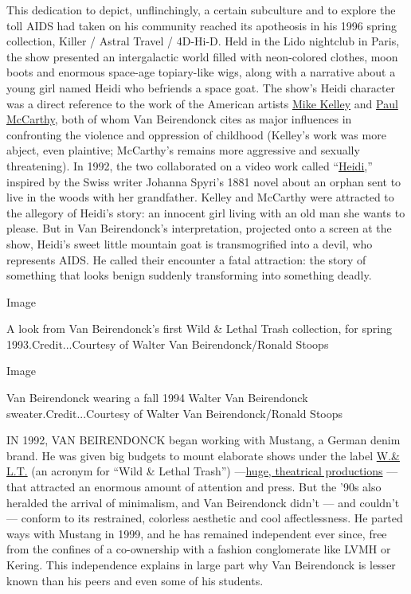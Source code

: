This dedication to depict, unflinchingly, a certain subculture and to
explore the toll AIDS had taken on his community reached its apotheosis
in his 1996 spring collection, Killer / Astral Travel / 4D-Hi-D. Held in
the Lido nightclub in Paris, the show presented an intergalactic world
filled with neon-colored clothes, moon boots and enormous space-age
topiary-like wigs, along with a narrative about a young girl named Heidi
who befriends a space goat. The show's Heidi character was a direct
reference to the work of the American artists
\href{https://www.nytimes3xbfgragh.onion/2017/03/08/t-magazine/art/mike-kelley-mobile-homestead.html}{Mike
Kelley} and
\href{https://www.nytimes3xbfgragh.onion/topic/person/paul-mccarthy}{Paul
McCarthy}, both of whom Van Beirendonck cites as major influences in
confronting the violence and oppression of childhood (Kelley's work was
more abject, even plaintive; McCarthy's remains more aggressive and
sexually threatening). In 1992, the two collaborated on a video work
called ``\href{https://www.eai.org/titles/heidi}{Heidi},'' inspired by
the Swiss writer Johanna Spyri's 1881 novel about an orphan sent to live
in the woods with her grandfather. Kelley and McCarthy were attracted to
the allegory of Heidi's story: an innocent girl living with an old man
she wants to please. But in Van Beirendonck's interpretation, projected
onto a screen at the show, Heidi's sweet little mountain goat is
transmogrified into a devil, who represents AIDS. He called their
encounter a fatal attraction: the story of something that looks benign
suddenly transforming into something deadly.

Image

A look from Van Beirendonck's first Wild \& Lethal Trash collection, for
spring 1993.Credit...Courtesy of Walter Van Beirendonck/Ronald Stoops

Image

Van Beirendonck wearing a fall 1994 Walter Van Beirendonck
sweater.Credit...Courtesy of Walter Van Beirendonck/Ronald Stoops

IN 1992, VAN BEIRENDONCK began working with Mustang, a German denim
brand. He was given big budgets to mount elaborate shows under the label
\href{https://www.nytimes3xbfgragh.onion/1995/10/03/style/IHT-belgian-designers-walk-on-the-urban-wild-side.html}{W.\&
L.T.} (an acronym for ``Wild \& Lethal Trash'')
---\href{https://www.nytimes3xbfgragh.onion/1998/02/08/style/out-there-a-provocateur-of-the-paris-runways.html}{huge,
theatrical productions} --- that attracted an enormous amount of
attention and press. But the '90s also heralded the arrival of
minimalism, and Van Beirendonck didn't --- and couldn't --- conform to
its restrained, colorless aesthetic and cool affectlessness. He parted
ways with Mustang in 1999, and he has remained independent ever since,
free from the confines of a co-ownership with a fashion conglomerate
like LVMH or Kering. This independence explains in large part why Van
Beirendonck is lesser known than his peers and even some of his
students.

